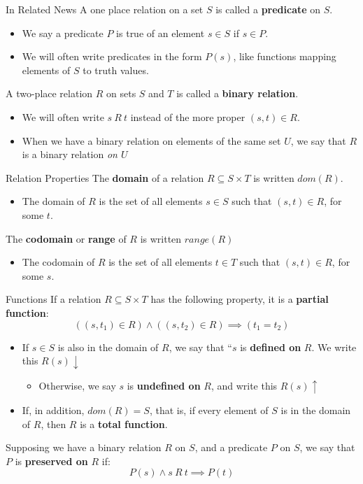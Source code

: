 \documentclass[11pt]{beamer}
\begin{document}
\begin{frame}[fragile=singleslide]{In Related News}
A one place relation on a set $S$ is called a \textbf{predicate} on $S$.
\begin{itemize}
\item We say a predicate $P$ is true of an element $s \in S$ if $s \in P$. 
\item We will often write predicates in the form $P(s)$, like functions mapping elements of $S$ to truth values.  
\end{itemize}
A two-place relation $R$ on sets $S$ and $T$ is called a \textbf{binary relation}.
\begin{itemize}
\item We will often write $s\:R\:t$ instead of the more proper $(s,t) \in R$.
\item When we have a binary relation on elements of the same set $U$, we say that $R$ is a binary relation \emph{on $U$}
\end{itemize}
\end{frame}

\begin{frame}[fragile=singleslide]{Relation Properties}
The \textbf{domain} of a relation $R \subseteq S \times T$ is written $dom(R)$.
\begin{itemize}
\item The domain of $R$ is the set of all elements $s \in S$ such that $(s,t) \in R$, for some $t$.
\end{itemize}
The \textbf{codomain} or \textbf{range} of $R$ is written $range(R)$
\begin{itemize}
\item The codomain of $R$ is the set of all elements $t \in T$ such that $(s,t) \in R$, for some $s$.
\end{itemize}
\end{frame}

\begin{frame}[fragile=singleslide]{Functions}
If a relation $R \subseteq S \times T$ has the following property, it is a \textbf{partial function}:
\begin{equation}
((s,t_1) \in R) \land ((s, t_2) \in R) \implies (t_1 = t_2)
\end{equation}
\begin{itemize}
\item If $s \in S$ is also in the domain of $R$, we say that ``$s$ is \textbf{defined on} $R$.  We write this $R(s) \downarrow$
\begin{itemize}
\item Otherwise, we say $s$ is \textbf{undefined on} $R$, and write this $R(s) \uparrow$
\end{itemize}
\item If, in addition, $dom(R) = S$, that is, if every element of $S$ is in the domain of $R$, then $R$ is a \textbf{total function}.  
\end{itemize}
Supposing we have a binary relation $R$ on $S$, and a predicate $P$ on $S$, we say that $P$ is \textbf{preserved on} $R$ if:
\begin{equation}
P(s) \land s\:R\:t \implies P(t)
\end{equation}
\end{frame}
\end{document}
